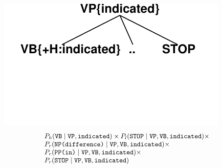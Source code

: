\begin{frame}
\begin{center}
 \includegraphics[scale=.5]{figures/bilexicalcfg5} 
\[ \begin{array}{l}
 P_h(\mbox{\tt VB} \mid \mbox{\tt VP}, \mbox{\tt indicated}) \times 
 P_l(\mbox{\tt STOP} \mid \mbox{\tt VP}, \mbox{\tt VB}, \mbox{\tt indicated}) \times
 \\ 
 P_r(\mbox{\tt NP(difference)} \mid \mbox{\tt VP}, \mbox{\tt VB},
 \mbox{\tt indicated}) \times \\
 P_r(\mbox{\tt PP(in)} \mid \mbox{\tt VP}, \mbox{\tt VB}, \mbox{\tt indicated}) \times
 \\ 
 P_r(\mbox{\tt STOP} \mid \mbox{\tt VP}, \mbox{\tt VB}, \mbox{\tt indicated})
 \end{array} \]
\end{center}
\end{frame}


